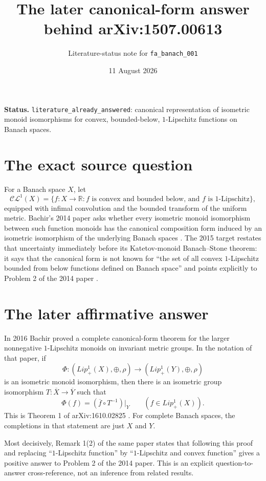 \documentclass[11pt]{article}
\title{The later canonical-form answer behind arXiv:1507.00613}
\author{Literature-status note for \texttt{fa\_banach\_001}}
\date{11 August 2026}
\begin{document}
\maketitle

\noindent\textbf{Status.}
\texttt{literature\_already\_answered}: canonical representation of
isometric monoid isomorphisms for convex, bounded-below, $1$-Lipschitz
functions on Banach spaces.

\section*{The exact source question}

For a Banach space $X$, let 
\[
 \mathcal{CL}^{1}(X)=\{f:X\to\mathbb R: f\text{ is convex and bounded
 below, and }f\text{ is }1\text{-Lipschitz}\},
\]
equipped with infimal convolution and the bounded transform of the uniform
metric.  Bachir's 2014 paper asks whether every isometric monoid
isomorphism between such function monoids has the canonical composition
form induced by an isometric isomorphism of the underlying Banach spaces
\cite{B14}.  The 2015 target restates that uncertainty immediately before
its Katetov-monoid Banach--Stone theorem: it says that the canonical form is
not known for ``the set of all convex $1$-Lipschitz bounded from below
functions defined on Banach space'' and points explicitly to Problem 2 of
the 2014 paper \cite{B15}.

\section*{The later affirmative answer}

In 2016 Bachir proved a complete canonical-form theorem for the larger
nonnegative $1$-Lipschitz monoids on invariant metric groups.  In the
notation of that paper, if
\[
 \Phi:(Lip^1_+(X),\oplus,\rho)\longrightarrow
       (Lip^1_+(Y),\oplus,\rho)
\]
is an isometric monoid isomorphism, then there is an isometric group
isomorphism $T:\overline X\to\overline Y$ such that
\[
 \Phi(f)=(\overline f\circ T^{-1})|_Y
 \qquad(f\in Lip^1_+(X)).
\]
This is Theorem 1 of arXiv:1610.02825 \cite{B16}.  For complete Banach
spaces, the completions in that statement are just $X$ and $Y$.

Most decisively, Remark 1(2) of the same paper states that following this
proof and replacing ``$1$-Lipschitz function'' by ``$1$-Lipschitz and
convex function'' gives a positive answer to Problem 2 of the 2014 paper.
This is an explicit question-to-answer cross-reference, not an inference
from related results.
\end{document}
